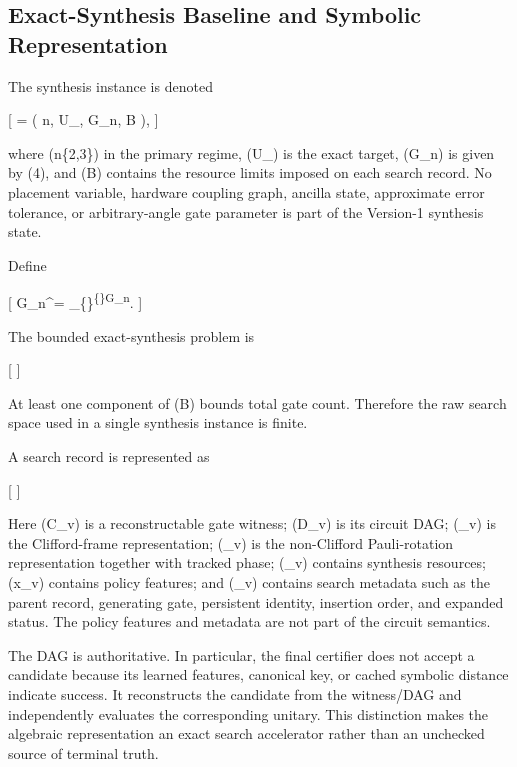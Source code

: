 \documentclass[
]{article}
\begin{document}
\hypertarget{exact-synthesis-baseline-and-symbolic-representation}{%
\subsection{Exact-Synthesis Baseline and Symbolic
Representation}\label{exact-synthesis-baseline-and-symbolic-representation}}

The synthesis instance is denoted

{[} \xi = \left( n, U\_\star, \mathcal G\_n, \mathbf B \right), 
{]}

where (n\in\{2,3\}) in the primary regime, (U\_\star) is the exact
target, (\mathcal G\_n) is given by (4), and (\mathbf B) contains the
resource limits imposed on each search record. No placement variable,
hardware coupling graph, ancilla state, approximate error tolerance, or
arbitrary-angle gate parameter is part of the Version-1 synthesis state.

Define

{[} \mathcal G\_n\^{}\ast =
\bigcup\_\{\}\textsuperscript{\{\infty\}\mathcal G\_n}\ell. {]}

The bounded exact-synthesis problem is

{[}   {]}

At least one component of (\mathbf B) bounds total gate count. Therefore
the raw search space used in a single synthesis instance is finite.

A search record is represented as

{[}   {]}

Here (C\_v) is a reconstructable gate witness; (D\_v) is its circuit
DAG; (\Theta\_v) is the Clifford-frame representation; (\Phi\_v) is the
non-Clifford Pauli-rotation representation together with tracked phase;
(\boldsymbol\rho\_v) contains synthesis resources; (\mathbf x\_v)
contains policy features; and (\zeta\_v) contains search metadata such
as the parent record, generating gate, persistent identity, insertion
order, and expanded status. The policy features and metadata are not
part of the circuit semantics.

The DAG is authoritative. In particular, the final certifier does not
accept a candidate because its learned features, canonical key, or
cached symbolic distance indicate success. It reconstructs the candidate
from the witness/DAG and independently evaluates the corresponding
unitary. This distinction makes the algebraic representation an exact
search accelerator rather than an unchecked source of terminal truth.
\end{document}

